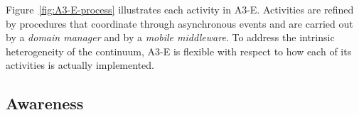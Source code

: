 
Figure~\ref{fig:A3-E-process} illustrates each activity in A3-E. 
Activities are refined by procedures that coordinate through asynchronous events and are carried out by a \textit{domain manager} and by a \textit{mobile middleware}. 
To address the intrinsic heterogeneity of the continuum, A3-E is flexible with respect to how each of its activities is actually implemented. 






\subsection{Awareness}\label{sec:A3-E-awareness}




